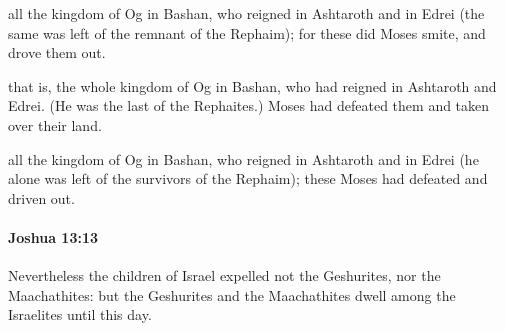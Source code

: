 			\begin{versebox}
					\item[BHS] 
					\item[ASV] all the kingdom of Og in Bashan, who reigned in Ashtaroth and in Edrei (the same was left of the remnant of the Rephaim); for these did Moses smite, and drove them out.
					\item[NIV] that is, the whole kingdom of Og in Bashan, who had reigned in Ashtaroth and Edrei. (He was the last of the Rephaites.) Moses had defeated them and taken over their land.
					\item[NRSV] all the kingdom of Og in Bashan, who reigned in Ashtaroth and in Edrei (he alone was left of the survivors of the Rephaim); these Moses had defeated and driven out.
			\end{versebox}

		\paragraph{Joshua 13:13} %
			\label{JOSHUA-13-13}

			Nevertheless the children of Israel expelled not the Geshurites, nor the Maachathites: but the Geshurites and the Maachathites dwell among the Israelites until this day.

